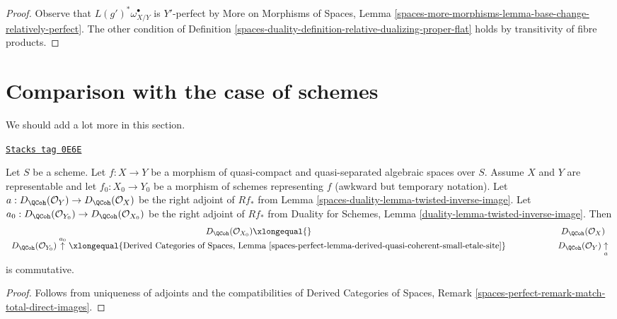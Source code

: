 \begin{proof}
Observe that $L(g')^*\omega_{X/Y}^\bullet$ is $Y'$-perfect by
More on Morphisms of Spaces, Lemma
\ref{spaces-more-morphisms-lemma-base-change-relatively-perfect}.
The other condition of
Definition \ref{spaces-duality-definition-relative-dualizing-proper-flat}
holds by transitivity of fibre products.
\end{proof}

\section{Comparison with the case of schemes}
\label{spaces-duality-section-comparison}
We should add a lot more in this section.

\begin{lemma}[Compare]
\label{spaces-duality-lemma-compare}
\href{https://stacks.math.columbia.edu/tag/0E6E}{\texttt{Stacks tag 0E6E}}

Let $S$ be a scheme. Let $f : X \to Y$ be a morphism of
quasi-compact and quasi-separated algebraic spaces over $S$.
Assume $X$ and $Y$ are representable and let $f_0 : X_0 \to Y_0$ be a
morphism of schemes representing $f$ (awkward but temporary notation).
Let $a : D_\QCoh(\mathcal{O}_Y) \to D_\QCoh(\mathcal{O}_X)$
be the right adjoint of $Rf_*$ from Lemma \ref{spaces-duality-lemma-twisted-inverse-image}.
Let $a_0 : D_\QCoh(\mathcal{O}_{Y_0}) \to D_\QCoh(\mathcal{O}_{X_0})$
be the right adjoint of $Rf_*$ from
Duality for Schemes, Lemma \ref{duality-lemma-twisted-inverse-image}.
Then
$$
\begin{array}{ccccccc}D_\QCoh(\mathcal{O}_{X_0})
\xlongequal{} &  &  &  &  &  & D_\QCoh(\mathcal{O}_X) \\ D_\QCoh(\mathcal{O}_{Y_0}) \overset{a_0}{\uparrow}\xlongequal{\text{Derived Categories of Spaces, Lemma
\ref{spaces-perfect-lemma-derived-quasi-coherent-small-etale-site}}} &  &  &  &  &  & D_\QCoh(\mathcal{O}_Y) \underset{a}{\uparrow}\end{array}
$$
is commutative.
\end{lemma}

\begin{proof}
Follows from uniqueness of adjoints and the compatibilities of
Derived Categories of Spaces, Remark
\ref{spaces-perfect-remark-match-total-direct-images}.
\end{proof}



